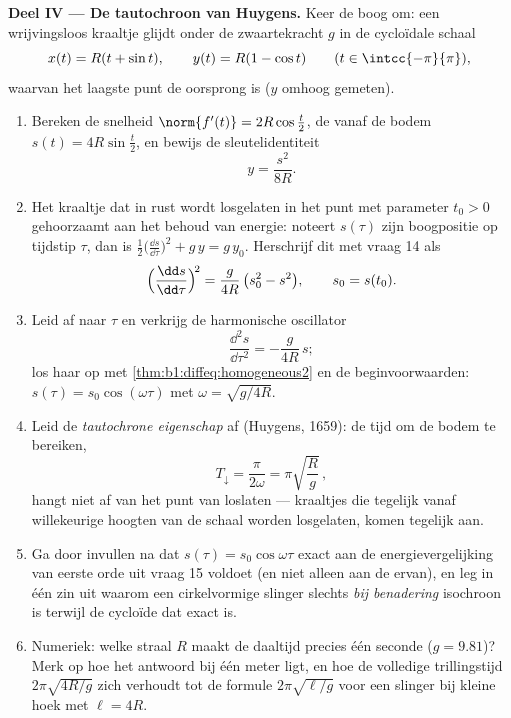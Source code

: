 \begin{problem}
\medskip
\noindent\textbf{Deel IV --- De tautochroon van Huygens.} Keer de
boog om: een wrijvingsloos kraaltje glijdt onder de zwaartekracht
$g$ in de cycloïdale schaal
\[
x(t) = R(t + \sin t), \qquad y(t) = R(1 - \cos t)
\qquad (t \in \intcc{-\pi}{\pi}),
\]
waarvan het laagste punt de oorsprong is ($y$ omhoog gemeten).
\begin{enumerate}[resume]
  \item Bereken de snelheid $\norm{f'(t)} = 2R\cos\frac t2$, de
         vanaf de bodem $s(t) = 4R\sin\frac t2$, en
        bewijs de sleutelidentiteit
        \[
        y = \frac{s^2}{8R} .
        \]
  \item Het kraaltje dat in rust wordt losgelaten in het punt met
        parameter $t_0 > 0$ gehoorzaamt aan het behoud van energie:
        noteert $s(\tau)$ zijn boogpositie op tijdstip $\tau$, dan
        is $\frac12\bigl(\frac{\dd s}{\dd\tau}\bigr)^2 + g\,y =
        g\,y_0$. Herschrijf dit met vraag 14 als
        \[
        \Bigl(\frac{\dd s}{\dd\tau}\Bigr)^{\!2}
        = \frac{g}{4R}\,\bigl(s_0^2 - s^2\bigr),
        \qquad s_0 = s(t_0).
        \]
  \item Leid af naar $\tau$ en verkrijg de harmonische oscillator
        \[
        \frac{\dd^2 s}{\dd\tau^2} = -\frac{g}{4R}\,s ;
        \]
        los haar op met \cref{thm:b1:diffeq:homogeneous2} en de
        beginvoorwaarden: $s(\tau) = s_0\cos(\omega\tau)$ met
        $\omega = \sqrt{g/4R}$.
  \item Leid de \emph{tautochrone eigenschap} af (Huygens, 1659):
        de tijd om de bodem te bereiken,
        \[
        T_{\downarrow} = \frac{\pi}{2\omega}
        = \pi\sqrt{\frac Rg}\,,
        \]
        hangt niet af van het punt van loslaten --- kraaltjes die
        tegelijk vanaf willekeurige hoogten van de schaal worden
        losgelaten, komen tegelijk aan.
  \item Ga door invullen na dat $s(\tau) = s_0\cos\omega\tau$
        exact aan de energievergelijking van eerste orde uit vraag
        15 voldoet (en niet alleen aan de  ervan), en leg
        in één zin uit waarom een cirkelvormige slinger slechts
        \emph{bij benadering} isochroon is terwijl de cycloïde dat
        exact is.
  \item Numeriek: welke straal $R$ maakt de daaltijd precies één
        seconde ($g = 9.81$)? Merk op hoe  het antwoord bij
        één meter ligt, en hoe de volledige trillingstijd
        $2\pi\sqrt{4R/g}$ zich verhoudt tot de formule
        $2\pi\sqrt{\ell/g}$ voor een slinger bij kleine hoek met
        $\ell = 4R$.
\end{enumerate}


\end{problem}
